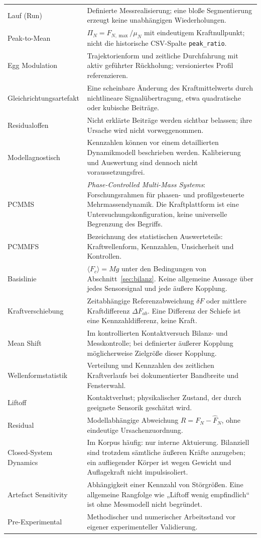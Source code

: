 \documentclass[11pt,a4paper]{article}
\newcommand{\PCMMS}{\textit{Phase-Controlled Multi-Mass Systems}}
\begin{document}
\begin{longtable}{@{}L{.29\textwidth}L{.68\textwidth}@{}}
Lauf (Run)&Definierte Messrealisierung; eine bloße Segmentierung erzeugt keine unabhängigen Wiederholungen.\\
Peak-to-Mean&$\Pi_N=F_{N,\max}/\mu_N$ mit eindeutigem Kraftnullpunkt; nicht die historische CSV-Spalte \texttt{peak\_ratio}.\\
Egg Modulation&Trajektorienform und zeitliche Durchfahrung mit aktiv geführter Rückholung; versioniertes Profil referenzieren.\\
Gleichrichtungsartefakt&Eine scheinbare Änderung des Kraftmittelwerts durch nichtlineare Signalübertragung, etwa quadratische oder kubische Beiträge.\\
Residualoffen&Nicht erklärte Beiträge werden sichtbar belassen; ihre Ursache wird nicht vorweggenommen.\\
Modellagnostisch&Kennzahlen können vor einem detaillierten Dynamikmodell beschrieben werden. Kalibrierung und Auswertung sind dennoch nicht voraussetzungsfrei.\\
PCMMS&\PCMMS: Forschungsrahmen für phasen- und profilgesteuerte Mehrmassendynamik. Die Kraftplattform ist eine Untersuchungskonfiguration, keine universelle Begrenzung des Begriffs.\\
PCMMFS&Bezeichnung des statistischen Auswerteteils: Kraftwellenform, Kennzahlen, Unsicherheit und Kontrollen.\\
Basislinie&$\langle F_c\rangle=Mg$ unter den Bedingungen von Abschnitt~\ref{sec:bilanz}. Keine allgemeine Aussage über jedes Sensorsignal und jede äußere Kopplung.\\
Kraftverschiebung&Zeitabhängige Referenzabweichung $\delta F$ oder mittlere Kraftdifferenz $\Delta F_{ab}$. Eine Differenz der Schiefe ist eine Kennzahldifferenz, keine Kraft.\\
Mean Shift&Im kontrollierten Kontaktversuch Bilanz- und Messkontrolle; bei definierter äußerer Kopplung möglicherweise Zielgröße dieser Kopplung.\\
Wellenformstatistik&Verteilung und Kennzahlen des zeitlichen Kraftverlaufs bei dokumentierter Bandbreite und Fensterwahl.\\
Liftoff&Kontaktverlust; physikalischer Zustand, der durch geeignete Sensorik geschätzt wird.\\
Residual&Modellabhängige Abweichung $R=F_N-\hat F_N$, ohne eindeutige Ursachenzuordnung.\\
Closed-System Dynamics&Im Korpus häufig: nur interne Aktuierung. Bilanziell sind trotzdem sämtliche äußeren Kräfte anzugeben; ein aufliegender Körper ist wegen Gewicht und Auflagekraft nicht impulsisoliert.\\
Artefact Sensitivity&Abhängigkeit einer Kennzahl von Störgrößen. Eine allgemeine Rangfolge wie „Liftoff wenig empfindlich“ ist ohne Messmodell nicht begründet.\\
Pre-Experimental&Methodischer und numerischer Arbeitsstand vor eigener experimenteller Validierung.\\
\bottomrule\end{longtable}
\end{document}
